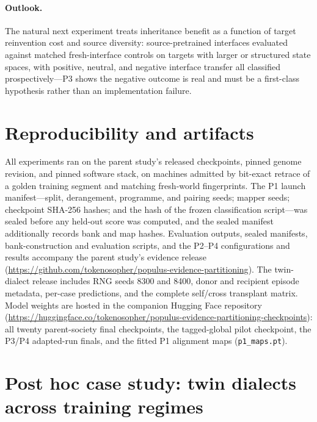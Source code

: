 \documentclass[11pt]{article}
\begin{document}
\paragraph{Outlook.} The natural next experiment treats inheritance benefit as a function of target reinvention cost and source diversity: source-pretrained interfaces evaluated against matched fresh-interface controls on targets with larger or structured state spaces, with positive, neutral, and negative interface transfer all classified prospectively---P3 shows the negative outcome is real and must be a first-class hypothesis rather than an implementation failure.

\section*{Reproducibility and artifacts}
All experiments ran on the parent study's released checkpoints, pinned genome revision, and pinned software stack, on machines admitted by bit-exact retrace of a golden training segment and matching fresh-world fingerprints. The P1 launch manifest---split, derangement, programme, and pairing seeds; mapper seeds; checkpoint SHA-256 hashes; and the hash of the frozen classification script---was sealed before any held-out score was computed, and the sealed manifest additionally records bank and map hashes. Evaluation outputs, sealed manifests, bank-construction and evaluation scripts, and the P2--P4 configurations and results accompany the parent study's evidence release (\url{https://github.com/tokenosopher/populus-evidence-partitioning}). The twin-dialect release includes RNG seeds 8300 and 8400, donor and recipient episode metadata, per-case predictions, and the complete self/cross transplant matrix. Model weights are hosted in the companion Hugging Face repository (\url{https://huggingface.co/tokenosopher/populus-evidence-partitioning-checkpoints}): all twenty parent-society final checkpoints, the tagged-global pilot checkpoint, the P3/P4 adapted-run finals, and the fitted P1 alignment maps (\texttt{p1\_maps.pt}).

\appendix

\section{Post hoc case study: twin dialects across training regimes}\label{app:twins}
\end{document}
